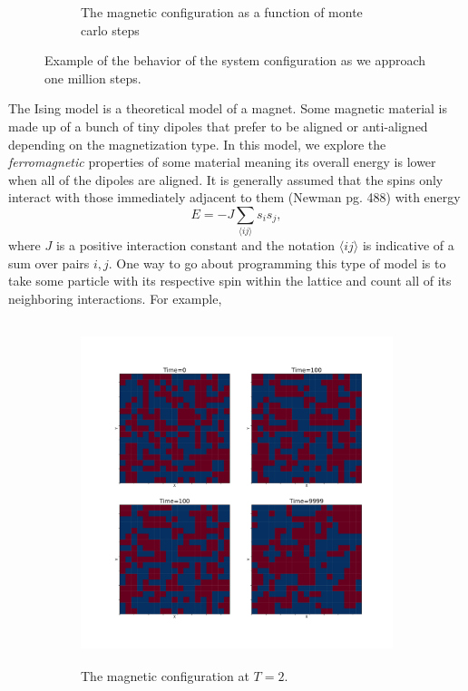 \documentclass{article}
\begin{document}
\begin{enumerate}
{\begin{figure}[h!]
\begin{subfigure}[t]{0.5\textwidth}
        \caption{The magnetic configuration as a function of monte carlo steps}
    \end{subfigure}
    \caption{Example of the behavior of the system configuration as we approach one million steps.}
    \end{figure}
    The Ising model is a theoretical model of a magnet. Some magnetic material is made up of a bunch of tiny dipoles that prefer to be aligned or anti-aligned depending on the magnetization type. In this model, we explore the \textit{ferromagnetic} properties of some material meaning its overall energy is lower when all of the dipoles are aligned. It is generally assumed that the spins only interact with those immediately adjacent to them (Newman pg. 488) with energy
    \begin{equation}
        E = - J \sum_{\langle ij \rangle}s_is_j,
    \end{equation}
    where $J$ is a positive interaction constant and the notation $\langle ij \rangle$ is indicative of a sum over pairs $i,j$. One way to go about programming this type of model is to take some particle with its respective spin within the lattice and count all of its neighboring interactions. For example,
    \begin{figure}[h!]
    \centering
    \begin{subfigure}[t]{0.5\textwidth}
        \centering
        \includegraphics[width=\textwidth, height=10cm]{config2.pdf}
        \caption{The magnetic configuration at $T=2$.}
    \end{subfigure}%
    ~ 
    \begin{subfigure}[t]{0.5\textwidth}

\end{subfigure}
\end{figure}}
\end{enumerate}
\end{document}
